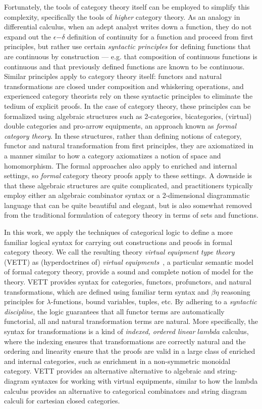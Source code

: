 \documentclass{llncs}
\begin{document}
Fortunately, the tools of category theory itself can be employed to
simplify this complexity, specifically the tools of \emph{higher}
category theory.
%
As an analogy in differential calculus, when an adept analyst writes
down a function, they do not expand out the $\epsilon\mathord{-}\delta$
definition of continuity for a function and proceed from first
principles, but rather use certain \emph{syntactic principles} for
defining functions that are continuous by construction --- e.g. that
composition of continuous functions is continuous and that previously
defined functions are known to be continuous.
%
Similar principles apply to category theory itself: functors and
natural transformations are closed under composition and whiskering
operations, and experienced category theorists rely on these syntactic
principles to eliminate the tedium of explicit proofs.
%
In the case of category theory, these principles can be formalized
using algebraic structures such as 2-categories, bicategories,
(virtual) double categories and pro-arrow equipments\cite{TODO}, an
approach known as \emph{formal category theory}.
%
In these structures, rather than defining notions of category, functor
and natural transformation from first principles, they are axiomatized
in a manner similar to how a category axiomatizes a notion of space
and homomorphism.
%
The formal approaches also apply to enriched and internal settings, so
\emph{formal} category theory proofs apply to these settings.
%
A downside is that these algebraic structures are quite complicated, and
practitioners typically employ either an algebraic combinator syntax or
a 2-dimensional diagrammatic language that can be quite beautiful and
elegant, but is also somewhat removed from the traditional formulation
of category theory in terms of sets and functions.

In this work, we apply the techniques of categorical logic to define a
more familiar logical syntax for carrying out constructions and proofs
in formal category theory.  
%
We call the resulting theory \emph{virtual equipment type theory} (VETT)
as (hyperdoctrines of) \emph{virtual
  equipments}~\cite{virtualequipments}, a particular semantic model of
formal category theory, provide a sound and complete notion of model for
the theory.
%
VETT provides syntax for categories, functors, profunctors, and natural
transformations, which are defined using familiar term syntax and
$\beta\eta$ reasoning principles for $\lambda$-functions, bound
variables, tuples, etc.  
%
By adhering to a \emph{syntactic discipline}, the logic guarantees
that all functor terms are automatically functorial, all and natural
transformation terms are natural.
%
More specifically, the syntax for transformations is a kind of
\emph{indexed, ordered linear} $lambda$ calculus, where the indexing
ensures that transformations are correctly natural and the ordering and
linearity ensure that the proofs are valid in a large class of enriched
and internal categories, such as enrichment in a non-symmetric monoidal
category.
%
VETT provides an alternative alternative to algebraic and
string-diagram syntaxes for working with virtual equipments,
similar to how the lambda calculus provides an alternative to
categorical combinators and string diagram calculi for cartesian
closed categories.
\end{document}

